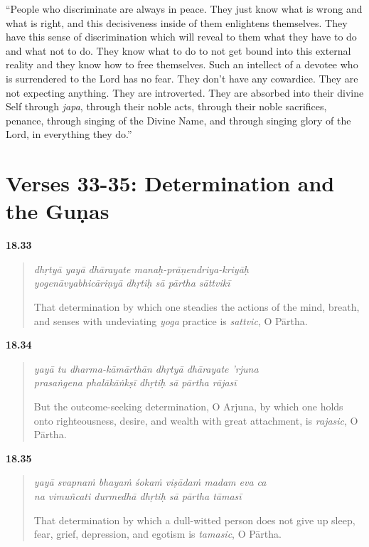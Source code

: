 \enquote{People who discriminate are always in peace. They just know what is wrong and what is right, and this decisiveness inside of them enlightens themselves. They have this sense of discrimination which will reveal to them what they have to do and what not to do. They know what to do to not get bound into this external reality and they know how to free themselves. Such an intellect of a devotee who is surrendered to the Lord has no fear. They don’t have any cowardice. They are not expecting anything. They are introverted. They are absorbed into their divine Self through \textit{japa}, through their noble acts, through their noble sacrifices, penance, through singing of the Divine Name, and through singing glory of the Lord, in everything they do.}

\section{Verses 33-35: Determination and the Guṇas}\label{sec-verses-33-35-determination-and-the-gunas}


\par\noindent\textbf{18.33}\par
\begin{verse}
\textit{dhṛtyā yayā dhārayate manaḥ-prāṇendriya-kriyāḥ} \\
\textit{yogenāvyabhicāriṇyā dhṛtiḥ sā pārtha sāttvikī}

\noindent That determination by which one steadies the actions of the mind, breath, and senses with undeviating \textit{yoga} practice is \textit{sattvic}, O Pārtha.
\end{verse}
\par




\par\noindent\textbf{18.34}\par
\begin{verse}
\textit{yayā tu dharma-kāmārthān dhṛtyā dhārayate ’rjuna} \\
\textit{prasaṅgena phalākāṅkṣī dhṛtiḥ sā pārtha rājasī}

\noindent But the outcome-seeking determination, O Arjuna, by which one holds onto righteousness, desire, and wealth with great attachment, is \textit{rajasic}, O Pārtha.
\end{verse}
\par



\par\noindent\textbf{18.35}\par
\begin{verse}
\textit{yayā svapnaṁ bhayaṁ śokaṁ viṣādaṁ madam eva ca} \\
\textit{na vimuñcati durmedhā dhṛtiḥ sā pārtha tāmasī}

\noindent That determination by which a dull-witted person does not give up sleep, fear, grief, depression, and egotism is \textit{tamasic}, O Pārtha.
\end{verse}
\par


